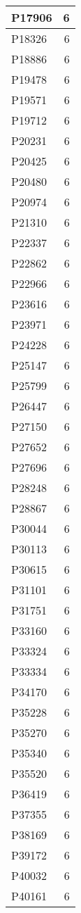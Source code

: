 \documentclass[
]{book}
\theoremstyle{definition}
\theoremstyle{definition}
\theoremstyle{definition}
\theoremstyle{definition}
\theoremstyle{remark}
\begin{document}
\begin{table}
\begin{tabular}{l|r}
\hline
P17906 & 6\\
\hline
P18326 & 6\\
\hline
P18886 & 6\\
\hline
P19478 & 6\\
\hline
P19571 & 6\\
\hline
P19712 & 6\\
\hline
P20231 & 6\\
\hline
P20425 & 6\\
\hline
P20480 & 6\\
\hline
P20974 & 6\\
\hline
P21310 & 6\\
\hline
P22337 & 6\\
\hline
P22862 & 6\\
\hline
P22966 & 6\\
\hline
P23616 & 6\\
\hline
P23971 & 6\\
\hline
P24228 & 6\\
\hline
P25147 & 6\\
\hline
P25799 & 6\\
\hline
P26447 & 6\\
\hline
P27150 & 6\\
\hline
P27652 & 6\\
\hline
P27696 & 6\\
\hline
P28248 & 6\\
\hline
P28867 & 6\\
\hline
P30044 & 6\\
\hline
P30113 & 6\\
\hline
P30615 & 6\\
\hline
P31101 & 6\\
\hline
P31751 & 6\\
\hline
P33160 & 6\\
\hline
P33324 & 6\\
\hline
P33334 & 6\\
\hline
P34170 & 6\\
\hline
P35228 & 6\\
\hline
P35270 & 6\\
\hline
P35340 & 6\\
\hline
P35520 & 6\\
\hline
P36419 & 6\\
\hline
P37355 & 6\\
\hline
P38169 & 6\\
\hline
P39172 & 6\\
\hline
P40032 & 6\\
\hline
P40161 & 6\\

\end{tabular}
\end{table}
\end{document}
